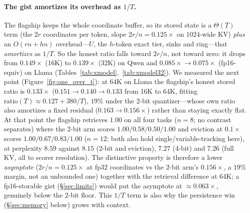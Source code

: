 \documentclass[11pt]{article}
\begin{document}
\paragraph{The gist amortizes its overhead as $1/T$.} The flagship keeps the
whole coordinate buffer, so its stored state is a $\Theta(T)$ term (the $2r$
coordinates per token, slope $2r/n=0.125\times$ on $1024$-wide KV) \emph{plus} an
$O(rn+hn)$ overhead---$U$, the $h$-token exact tier, sinks and ring---that
\emph{amortizes} as $1/T$. So the honest ratio falls toward $2r/n$, not toward
zero: it drops from $0.149\times$ (16K) to $0.139\times$ (32K) on Qwen and
$0.085\times\!\to\!0.075\times$ (fp16-equiv) on Llama
(Tables~\ref{tab:xmodel},~\ref{tab:xmodel32}). We measured the next point
(Figure~\ref{fig:one_over_t}): at 64K on Llama the flagship's honest stored ratio
is $0.133\times$ ($0.151\to0.140\to0.133$ from 16K to 64K, fitting
$\mathrm{ratio}(T)\approx0.127+380/T$), $19\%$ under the 2-bit quantizer---whose
own ratio also amortizes a fixed residual ($0.163\to0.156\times$) rather than
staying exactly flat. At that point the flagship retrieves $1.00$ on all four
tasks ($n{=}8$; no contrast separates) where the 2-bit arm scores
$1.00/0.58/0.50/1.00$ and eviction at $0.1\times$ scores $1.00/0.67/0.83/1.00$
($n{=}12$; both also hold single/variable-tracking here), at perplexity $8.59$
against $8.15$ (2-bit and eviction), $7.27$ (4-bit) and $7.26$ (full KV, all to
scorer resolution). The distinctive property is therefore a lower \emph{asymptote}
($2r/n=0.125\times$ at fp32 coordinates vs the 2-bit arm's $0.156\times$, a $19\%$
margin, not an unbounded one) together with the retrieval difference at 64K; a
fp16-storable gist (\S\ref{sec:limits}) would put the asymptote at
$\approx0.063\times$, genuinely below the 2-bit floor. This $1/T$ term is also why
the persistence win (\S\ref{sec:memory} below) grows with context.
\end{document}
